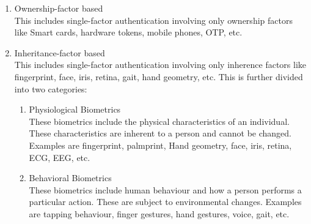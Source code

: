 \documentclass[10pt,journal,compsoc]{IEEEtran}
\begin{document}
\begin{enumerate}
\begin{enumerate}
          \end{enumerate}
          \item Ownership-factor based\\
          This includes single-factor authentication involving only ownership factors like Smart cards, hardware tokens, mobile phones, OTP, etc.
          \item Inheritance-factor based\\
          This includes single-factor authentication involving only inherence factors like fingerprint, face, iris, retina, gait, hand geometry, etc. This is further divided into two categories:
          \begin{enumerate}
              \item Physiological Biometrics\\
              These biometrics include the physical characteristics of an individual. These characteristics are inherent to a person and cannot be changed. Examples are fingerprint, palmprint, Hand geometry, face, iris, retina, ECG, EEG, etc.
              \item Behavioral Biometrics\\
              These biometrics include human behaviour and how a person performs a particular action. These are subject to environmental changes. Examples are tapping behaviour, finger gestures, hand gestures, voice, gait, etc.
          \end{enumerate}
          \end{enumerate}
\end{document}
